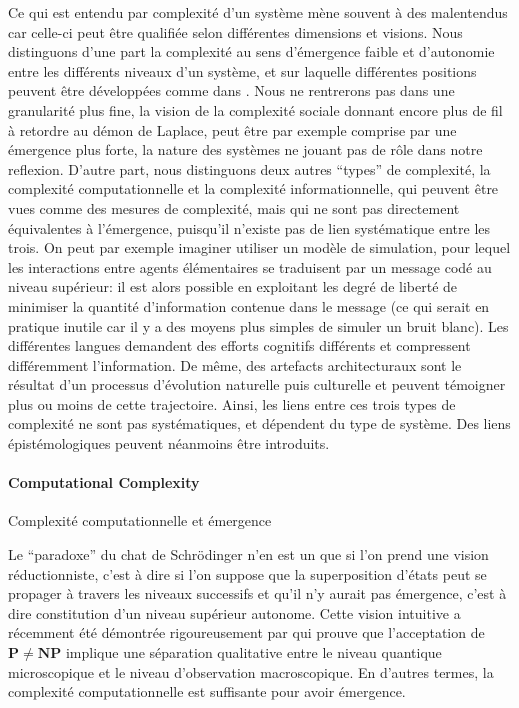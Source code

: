 Ce qui est entendu par complexité d'un système mène souvent à des malentendus car celle-ci peut être qualifiée selon différentes dimensions et visions. Nous distinguons d'une part la complexité au sens d'émergence faible et d'autonomie entre les différents niveaux d'un système, et sur laquelle différentes positions peuvent être développées comme dans \cite{deffuant2015visions}. Nous ne rentrerons pas dans une granularité plus fine, la vision de la complexité sociale donnant encore plus de fil à retordre au démon de Laplace, peut être par exemple comprise par une émergence plus forte, la nature des systèmes ne jouant pas de rôle dans notre reflexion. D'autre part, nous distinguons deux autres ``types'' de complexité, la complexité computationnelle et la complexité informationnelle, qui peuvent être vues comme des mesures de complexité, mais qui ne sont pas directement équivalentes à l'émergence, puisqu'il n'existe pas de lien systématique entre les trois. On peut par exemple imaginer utiliser un modèle de simulation, pour lequel les interactions entre agents élémentaires se traduisent par un message codé au niveau supérieur: il est alors possible en exploitant les degré de liberté de minimiser la quantité d'information contenue dans le message (ce qui serait en pratique inutile car il y a des moyens plus simples de simuler un bruit blanc). Les différentes langues demandent des efforts cognitifs différents et compressent différemment l'information. %
De même, des artefacts architecturaux sont le résultat d'un processus d'évolution naturelle puis culturelle et peuvent témoigner plus ou moins de cette trajectoire. Ainsi, les liens entre ces trois types de complexité ne sont pas systématiques, et dépendent du type de système. Des liens épistémologiques peuvent néanmoins être introduits.


\paragraph{Computational Complexity}{Complexité computationnelle et émergence}

Le ``paradoxe'' du chat de Schrödinger n'en est un que si l'on prend une vision réductionniste, c'est à dire si l'on suppose que la superposition d'états peut se propager à travers les niveaux successifs et qu'il n'y aurait pas émergence, c'est à dire constitution d'un niveau supérieur autonome. Cette vision intuitive a récemment été démontrée rigoureusement par \cite{2014arXiv1403.7686B} qui prouve que l'acceptation de $\mathbf{P}\neq\mathbf{NP}$ implique une séparation qualitative entre le niveau quantique microscopique et le niveau d'observation macroscopique. En d'autres termes, la complexité computationnelle est suffisante pour avoir émergence.


